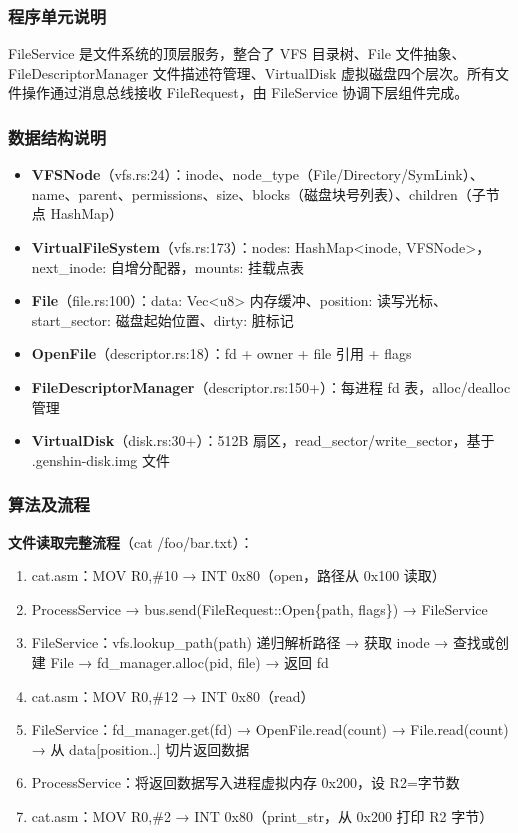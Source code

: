 \documentclass[UTF8,a4paper,12pt]{ctexart}
\begin{document}
\subsubsection{程序单元说明}

FileService 是文件系统的顶层服务，整合了 VFS 目录树、File 文件抽象、FileDescriptorManager 文件描述符管理、VirtualDisk 虚拟磁盘四个层次。所有文件操作通过消息总线接收 FileRequest，由 FileService 协调下层组件完成。

\subsubsection{数据结构说明}

\begin{itemize}
    \item \textbf{VFSNode}（vfs.rs:24）：inode、node\_type（File/Directory/SymLink）、name、parent、permissions、size、blocks（磁盘块号列表）、children（子节点 HashMap）
    \item \textbf{VirtualFileSystem}（vfs.rs:173）：nodes: HashMap<inode, VFSNode>，next\_inode: 自增分配器，mounts: 挂载点表
    \item \textbf{File}（file.rs:100）：data: Vec<u8> 内存缓冲、position: 读写光标、start\_sector: 磁盘起始位置、dirty: 脏标记
    \item \textbf{OpenFile}（descriptor.rs:18）：fd + owner + file 引用 + flags
    \item \textbf{FileDescriptorManager}（descriptor.rs:150+）：每进程 fd 表，alloc/dealloc 管理
    \item \textbf{VirtualDisk}（disk.rs:30+）：512B 扇区，read\_sector/write\_sector，基于 .genshin-disk.img 文件
\end{itemize}

\subsubsection{算法及流程}

\textbf{文件读取完整流程}（cat /foo/bar.txt）：

\begin{enumerate}[label=(\arabic*)]
    \item cat.asm：MOV R0,\#10 → INT 0x80（open，路径从 0x100 读取）
    \item ProcessService → bus.send(FileRequest::Open\{path, flags\}) → FileService
    \item FileService：vfs.lookup\_path(path) 递归解析路径 → 获取 inode → 查找或创建 File → fd\_manager.alloc(pid, file) → 返回 fd
    \item cat.asm：MOV R0,\#12 → INT 0x80（read）
    \item FileService：fd\_manager.get(fd) → OpenFile.read(count) → File.read(count) → 从 data[position..] 切片返回数据
    \item ProcessService：将返回数据写入进程虚拟内存 0x200，设 R2=字节数
    \item cat.asm：MOV R0,\#2 → INT 0x80（print\_str，从 0x200 打印 R2 字节）
\end{enumerate}
\end{document}
